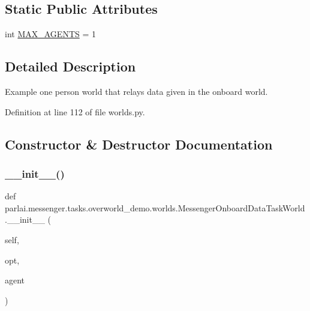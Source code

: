 \subsection*{Static Public Attributes}
\begin{DoxyCompactItemize}
\item 
int \hyperlink{classparlai_1_1messenger_1_1tasks_1_1overworld__demo_1_1worlds_1_1MessengerOnboardDataTaskWorld_a672adcce258c5fe57fa2808193522ae8}{M\+A\+X\+\_\+\+A\+G\+E\+N\+TS} = 1
\end{DoxyCompactItemize}


\subsection{Detailed Description}
\begin{DoxyVerb}Example one person world that relays data given in the onboard world.\end{DoxyVerb}
 

Definition at line 112 of file worlds.\+py.



\subsection{Constructor \& Destructor Documentation}
\mbox{\label{classparlai_1_1messenger_1_1tasks_1_1overworld__demo_1_1worlds_1_1MessengerOnboardDataTaskWorld_a8dce1c05d466cb86458722e074ceec38}} 
\subsubsection{\texorpdfstring{\+\_\+\+\_\+init\+\_\+\+\_\+()}{\_\_init\_\_()}}
{\footnotesize\ttfamily def parlai.\+messenger.\+tasks.\+overworld\+\_\+demo.\+worlds.\+Messenger\+Onboard\+Data\+Task\+World.\+\_\+\+\_\+init\+\_\+\+\_\+ (\begin{DoxyParamCaption}\item[{}]{self,  }\item[{}]{opt,  }\item[{}]{agent }\end{DoxyParamCaption})}



